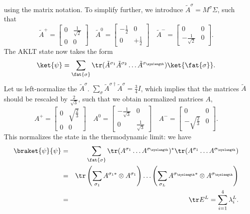 using the matrix notation. To simplify further, we introduce $\tilde{A}^\sigma= M^\sigma \Sigma$, such that
\begin{equation}
    \tilde{A}^+ = \left[ \begin{array}{cc} 0 & \frac{1}{\sqrt{2}} \\ 0 & 0 \end{array} \right] \quad
    \tilde{A}^0 = \left[ \begin{array}{cc} -\frac{1}{2} & 0 \\ 
    0 & +\frac{1}{2} \end{array} \right] \quad
    \tilde{A}^- = \left[ \begin{array}{cc} 0 & 0 \\ -\frac{1}{\sqrt{2}} & 0 \end{array} \right] .
    \label{eq:unnormalizeda}
\end{equation}
The AKLT state now takes the form 
\begin{equation}
    \ket{\psi} = \sum_{\fat{\sigma}} \tr (\tilde{A}^{\sigma_{1}} 
    \tilde{A}^{\sigma_{2}} \ldots \tilde{A}^{\sigma_{\syslength}}) \ket{\fat{\sigma}} .
    \label{eq:akltstate}
\end{equation}
Let us left-normalize the $\tilde{A}^\sigma$. $\sum_\sigma \tilde{A}^{\sigma\dagger}\tilde{A}^\sigma = \frac{3}{4}I$, which implies that the matrices $\tilde{A}$  should 
be rescaled by $\frac{2}{\sqrt{3}}$, such that we obtain normalized matrices $A$,
\begin{equation}
    A^+ = \left[ \begin{array}{cc} 0 & \sqrt{\frac{2}{3}} \\ 0 & 0 \end{array} \right] \quad
    A^0 = \left[ \begin{array}{cc} -\frac{1}{\sqrt{3}} & 0 \\ 
    0 & \frac{1}{\sqrt{3}} \end{array} \right] \quad
    A^- = \left[ \begin{array}{cc} 0 & 0 \\ -\sqrt{\frac{2}{3}} & 0 \end{array} \right] .
    \label{eq:normalizeda}
\end{equation}
This normalizes the state in the thermodynamic limit: we have
\begin{eqnarray*}
\braket{\psi}{\psi} &=& \sum_{\fat{\sigma}} \tr (A^{\sigma_1} \ldots A^{\sigma_\syslength})^* \tr (A^{\sigma_1} \ldots A^{\sigma_\syslength}) \\
&=&  \tr \left( \sum_{\sigma_1} A^{\sigma_1*} \otimes A^{\sigma_1}\right) \ldots \left( \sum_{\sigma_L} A^{\sigma_\syslength*}\otimes A^{\sigma_\syslength} \right) \\
&=& \tr E^L = \sum_{i=1}^4 \lambda_i^L .
\end{eqnarray*}

